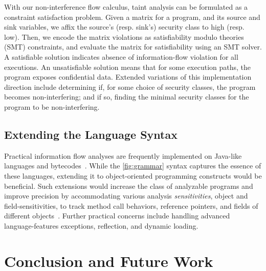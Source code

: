 With our non-interference flow calculus, taint analysis can be formulated as a constraint satisfaction problem.
Given a matrix for a program, and its source and sink variables,
we affix the source's (resp. sink's) security class to high (resp. low).
Then, we encode the matrix violations as satisfiability modulo theories (SMT) constraints, and evaluate the matrix for satisfiability using an SMT solver.
A satisfiable solution indicates absence of information-flow violation for all executions.
An unsatisfiable solution means that for some execution paths, the program exposes confidential data.
Extended variations of this implementation direction include
determining if, for some choice of security classes, the program becomes non-interfering;
and if so, finding the minimal security classes for the program to be non-interfering.

\tocless\subsection{Extending the Language Syntax}

Practical information flow analyses are frequently implemented on Java-like languages and bytecodes~\cite{hammer2009,huang2014,arzt2014,pauck2018}.
While the \autoref{fig:grammar} syntax captures the essence of these languages, extending it to object-oriented programming constructs would be beneficial.
Such extensions would increase the class of analyzable programs and improve precision by accommodating various analysis \emph{sensitivities},
\eg object and field-sensitivities, to track method call behaviors, reference pointers, and fields of different objects~\cite{arzt2014,hammer2009}.
Further practical concerns include handling advanced language-features \eg exceptions, reflection, and dynamic loading.


\tocless\section{Conclusion and Future Work}
\label{sec:conclusion}

